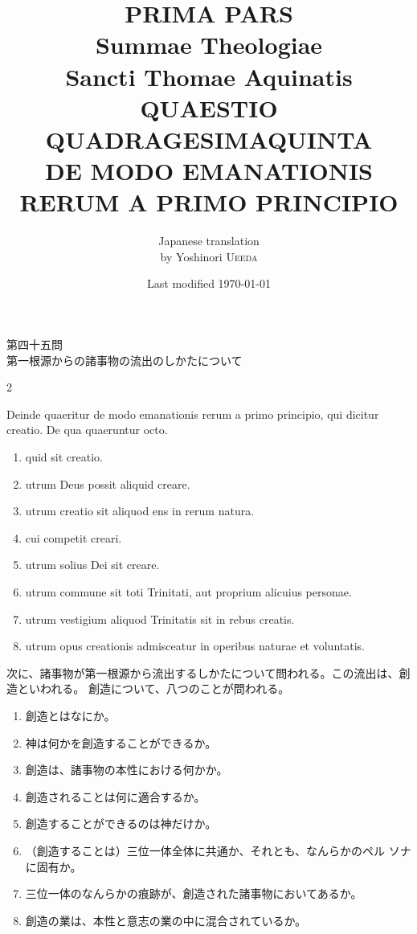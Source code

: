 \documentclass[paper=a4paper,fontsize=10pt,jafontsize=9pt,titlepage]{jlreq}
\title{{\bfseries PRIMA PARS}\\{\Huge Summae Theologiae}\\Sancti Thomae
Aquinatis\\{\sffamily QUAESTIO QUADRAGESIMAQUINTA}\\DE MODO
EMANATIONIS RERUM A PRIMO PRINCIPIO}
\author{Japanese translation\\by Yoshinori {\scshape Ueeda}}
\date{Last modified \today}
\begin{document}
\maketitle

\begin{center}
{\Large 第四十五問\\第一根源からの諸事物の流出のしかたについて}
\end{center}

\begin{paracol}{2}

Deinde quaeritur de modo emanationis rerum a primo principio, qui
 dicitur creatio. De qua quaeruntur octo.
\begin{enumerate}
 \item quid sit creatio.
 \item utrum Deus possit aliquid creare.
 \item utrum creatio sit aliquod ens in rerum natura.
 \item cui competit creari.
 \item utrum solius Dei sit creare.
 \item utrum commune sit toti Trinitati, aut proprium alicuius personae.
 \item utrum vestigium aliquod Trinitatis sit in rebus creatis.
 \item utrum opus creationis admisceatur in operibus naturae et voluntatis.
\end{enumerate}

\switchcolumn

次に、諸事物が第一根源から流出するしかたについて問われる。この流出は、創
 造といわれる。
創造について、八つのことが問われる。
\begin{enumerate}
 \item 創造とはなにか。
 \item 神は何かを創造することができるか。
 \item 創造は、諸事物の本性における何かか。
 \item 創造されることは何に適合するか。
 \item 創造することができるのは神だけか。
 \item （創造することは）三位一体全体に共通か、それとも、なんらかのペル
       ソナに固有か。
 \item 三位一体のなんらかの痕跡が、創造された諸事物においてあるか。
 \item 創造の業は、本性と意志の業の中に混合されているか。
\end{enumerate}

\end{paracol}
\end{document}
